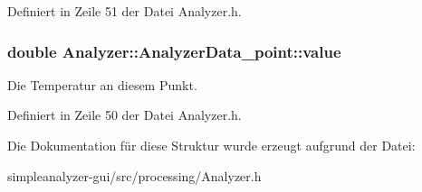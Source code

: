 Definiert in Zeile 51 der Datei Analyzer.\-h.

\hypertarget{structAnalyzer_1_1AnalyzerData__point_a150b00a3d0be5d1c75b39292d213cbfa}{
\subsubsection[{value}]{\setlength{\rightskip}{0pt plus 5cm}double Analyzer\-::\-Analyzer\-Data\-\_\-point\-::value}}\label{structAnalyzer_1_1AnalyzerData__point_a150b00a3d0be5d1c75b39292d213cbfa}
Die Temperatur an diesem Punkt. 

Definiert in Zeile 50 der Datei Analyzer.\-h.



Die Dokumentation für diese Struktur wurde erzeugt aufgrund der Datei\-:\begin{DoxyCompactItemize}
\item 
simpleanalyzer-\/gui/src/processing/Analyzer.\-h\end{DoxyCompactItemize}
